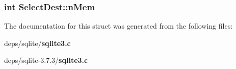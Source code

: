 \subsubsection{\setlength{\rightskip}{0pt plus 5cm}int \bf{Select\-Dest::n\-Mem}}\label{structSelectDest_8a5e41355c3d4d2ab1be3ad8418e7e8c}




The documentation for this struct was generated from the following files:\begin{CompactItemize}
\item 
deps/sqlite/\bf{sqlite3.c}\item 
deps/sqlite-3.7.3/\bf{sqlite3.c}\end{CompactItemize}
